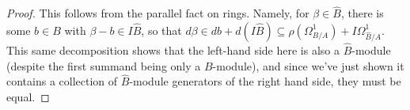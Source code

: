 \begin{proof}
	This follows from the parallel fact on rings. Namely, for $\beta \in \widehat{B}$, there is some $b \in B$ with $\beta - b \in I\widehat{B}$, so that $d\beta \in db + d\left(I\widehat{B}\right) \subseteq \rho(\Omega^1_{B/A})+I\Omega^1_{\widehat{B}/A}$. This same decomposition shows that the left-hand side here is also a $\widehat{B}$-module (despite the first summand being only a $B$-module), and since we've just shown it contains a collection of $\widehat{B}$-module generators of the right hand side, they must be equal.
	
	
\end{proof}
